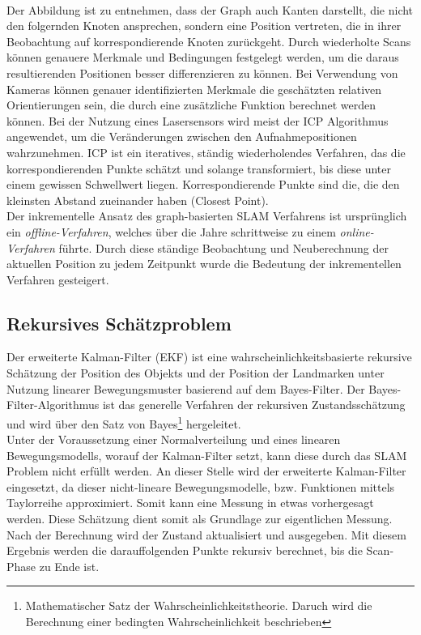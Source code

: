 \\ 
Der Abbildung ist zu entnehmen, dass der Graph auch Kanten darstellt, die nicht den folgernden Knoten ansprechen, sondern eine 
Position vertreten, die in ihrer Beobachtung auf korrespondierende Knoten zurückgeht. Durch wiederholte Scans können genauere Merkmale und 
Bedingungen festgelegt werden, um die daraus resultierenden Positionen besser differenzieren zu können. Bei Verwendung von Kameras können 
genauer identifizierten Merkmale die geschätzten relativen Orientierungen sein, die durch eine zusätzliche Funktion berechnet werden 
können. Bei der Nutzung eines Lasersensors wird meist der \ac{ICP} Algorithmus angewendet, um die Veränderungen zwischen den Aufnahmepositionen 
wahrzunehmen. \acs{ICP} ist ein iteratives, ständig wiederholendes Verfahren, das die korrespondierenden Punkte schätzt und solange transformiert, bis diese unter 
einem gewissen Schwellwert liegen. Korrespondierende Punkte sind die, die den kleinsten Abstand zueinander haben (Closest Point). \cite{robotik2.2020m}
\\ 
Der inkrementelle Ansatz des graph-basierten \acs{SLAM} Verfahrens ist ursprünglich ein \textit{offline-Verfahren}, welches über die Jahre 
schrittweise zu einem \textit{online-Verfahren} führte. Durch diese ständige Beobachtung und Neuberechnung der aktuellen Position zu jedem 
Zeitpunkt wurde die Bedeutung der inkrementellen Verfahren gesteigert. %

\subsection*{Rekursives Schätzproblem}
Der erweiterte Kalman-Filter (\acs{EKF}) ist eine wahrscheinlichkeitsbasierte rekursive Schätzung der Position des Objekts und der Position der 
Landmarken unter Nutzung linearer Bewegungsmuster basierend auf dem Bayes-Filter. Der Bayes-Filter-Algorithmus ist das generelle Verfahren der 
rekursiven Zustandsschätzung und wird über den Satz von Bayes\footnote{Mathematischer Satz der Wahrscheinlichkeitstheorie. Daruch wird die Berechnung einer bedingten Wahrscheinlichkeit beschrieben} 
hergeleitet. 
\\
Unter der Voraussetzung einer Normalverteilung und eines linearen Bewegungsmodells, worauf der Kalman-Filter setzt, kann diese durch das 
\acs{SLAM} Problem nicht erfüllt werden. An dieser Stelle wird der erweiterte Kalman-Filter eingesetzt, da dieser nicht-lineare 
Bewegungsmodelle, bzw. Funktionen mittels Taylorreihe approximiert. Somit kann eine Messung in etwas vorhergesagt werden. Diese Schätzung 
dient somit als Grundlage zur eigentlichen Messung. Nach der Berechnung wird der Zustand aktualisiert und ausgegeben. Mit diesem Ergebnis 
werden die darauffolgenden Punkte rekursiv berechnet, bis die Scan-Phase zu Ende ist.

